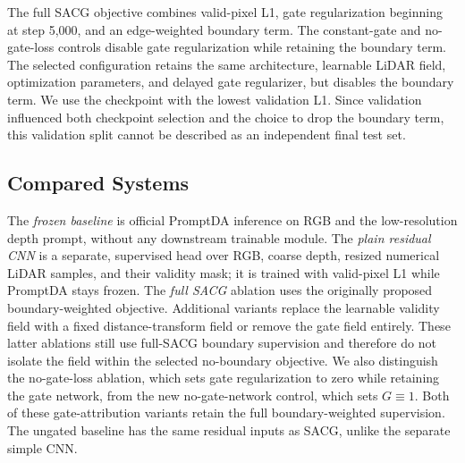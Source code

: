 The full SACG objective combines valid-pixel L1, gate regularization beginning at step 5,000, and an edge-weighted boundary term. The constant-gate and no-gate-loss controls disable gate regularization while retaining the boundary term. The selected configuration retains the same architecture, learnable LiDAR field, optimization parameters, and delayed gate regularizer, but disables the boundary term. We use the checkpoint with the lowest validation L1. Since validation influenced both checkpoint selection and the choice to drop the boundary term, this validation split cannot be described as an independent final test set.

\subsection{Compared Systems}
The \emph{frozen baseline} is official PromptDA inference on RGB and the low-resolution depth prompt, without any downstream trainable module. The \emph{plain residual CNN} is a separate, supervised head over RGB, coarse depth, resized numerical LiDAR samples, and their validity mask; it is trained with valid-pixel L1 while PromptDA stays frozen. The \emph{full SACG} ablation uses the originally proposed boundary-weighted objective. Additional variants replace the learnable validity field with a fixed distance-transform field or remove the gate field entirely. These latter ablations still use full-SACG boundary supervision and therefore do not isolate the field within the selected no-boundary objective. We also distinguish the no-gate-loss ablation, which sets gate regularization to zero while retaining the gate network, from the new no-gate-network control, which sets $G\equiv1$. Both of these gate-attribution variants retain the full boundary-weighted supervision. The ungated baseline has the same residual inputs as SACG, unlike the separate simple CNN.


